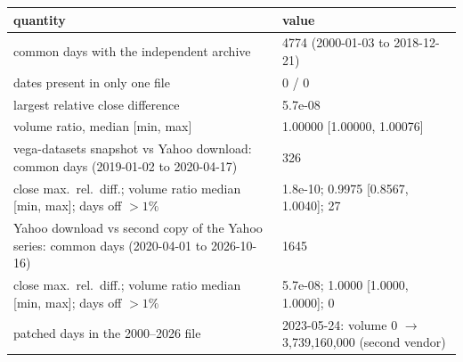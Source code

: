 \begin{tabular}{p{7.2cm}p{9.3cm}}\toprule quantity & value\\\midrule
common days with the independent archive & 4774 (2000-01-03 to 2018-12-21)\\
dates present in only one file & 0 / 0\\
largest relative close difference & 5.7e-08\\
volume ratio, median [min, max] & 1.00000 [1.00000, 1.00076]\\
vega-datasets snapshot vs Yahoo download: common days (2019-01-02 to 2020-04-17) & 326\\
\quad close max.\ rel.\ diff.; volume ratio median [min, max]; days off $>1\%$ & 1.8e-10; 0.9975 [0.8567, 1.0040]; 27\\
Yahoo download vs second copy of the Yahoo series: common days (2020-04-01 to 2026-10-16) & 1645\\
\quad close max.\ rel.\ diff.; volume ratio median [min, max]; days off $>1\%$ & 5.7e-08; 1.0000 [1.0000, 1.0000]; 0\\
patched days in the 2000--2026 file & 2023-05-24: volume 0 $\to$ 3,739,160,000 (second vendor)\\
\bottomrule\end{tabular}
